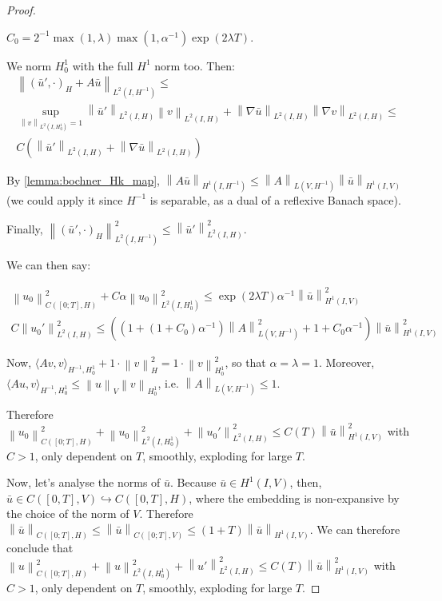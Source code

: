 \documentclass[english,a4paper,12pt,oneside]{scrbook}
\theoremstyle{break}
\newenvironment{mproof}[1][\proofname]{%
  \begin{proof}[#1]$ $\par\nobreak\ignorespaces
}{%
  \end{proof}
}
\renewcommand*{\proofname}{Proof}
\theoremstyle{remark}
\newcommand{\ds}{\displaystyle}
\newcommand{\norm}[1]{\left\lVert#1\right\rVert}
\newcommand{\HN}[1]{\norm{#1}_{H}}
\newcommand{\VN}[1]{\norm{#1}_{V}}
\newcommand{\emb}{\hookrightarrow}
\begin{document}
\begin{mproof}
$C_0 = \ds 2^{-1}\max(1,\lambda)\max(1,\alpha^{-1})\exp(2\lambda T)$.

We norm $H^1_0$ with the full $H^1$ norm too. Then:
\begin{align*}
\norm{(\bar{u}',\cdot)_H+ A \bar{u}}_{L^2(I,H^{-1})}\leq \\
\sup_{\norm{v}_{L^2(I,H^{1}_0)}=1}\norm{\bar{u}'}_{L^2(I,H)}\norm{v}_{L^2(I,H)}+\norm{\nabla \bar{u}}_{L^2(I,H)}\norm{\nabla v}_{L^2(I,H)}\leq \\C(\norm{\bar{u}'}_{L^2(I,H)}+\norm{\nabla \bar{u}}_{L^2(I,H)})
\end{align*}

By \cref{lemma:bochner_Hk_map}, $\norm{A \bar{u}}_{H^1(I, H^{-1})}\leq \norm{A}_{L(V,H^{-1})}\norm{\bar{u}}_{H^1(I,V)}$ (we could apply it since $H^{-1}$ is separable, as a dual of a reflexive Banach space).

Finally, $\norm{(\bar{u}',\cdot)_H}^2_{L^2(I,H^{-1})}\leq \norm{\bar{u}'}_{L^2(I,H)}^2$.

We can then say:

\begin{align*}
\norm{u_0}^2_{C([0;T],H)}+C\alpha\norm{u_0}_{L^2(I,H^1_0)}^2\leq \exp(2\lambda T)\alpha^{-1}\norm{\bar{u}}^2_{H^1(I,V)}\\
C\norm{u_0'}^2_{L^2(I,H)}\leq 
((1+(1+C_0)\alpha^{-1})\norm{A}_{L(V,H^{-1})}^2 +1 +C_0\alpha^{-1})\norm{\bar{u}}^2_{H^1(I,V)}
\end{align*}

Now, $\langle Av, v\rangle_{H^{-1}, H^1_0} + 1\cdot  \HN{v}^2 = 1\cdot \norm{v}_{H^1_0}^2$, so that $\alpha=\lambda=1$. Moreover, $\langle Au, v\rangle_{H^{-1}, H^1_0}\leq \VN{u}\norm{v}_{H^1_0}$, i.e. $\norm{A}_{L(V,H^{-1})}\leq 1$.

Therefore $\norm{u_0}^2_{C([0;T],H)}+\norm{u_0}_{L^2(I,H^1_0)}^2 + \norm{u_0'}^2_{L^2(I,H)}\leq C(T)\norm{\bar{u}}_{H^1(I,V)}^2$ with $C>1$, only dependent on $T$, smoothly, exploding for large $T$.

Now, let's analyse the norms of $\bar{u}$. Because $\bar{u}\in H^1(I,V)$, then, $\bar{u} \in C([0,T],V)\emb C([0,T],H)$, where the embedding is non-expansive by the choice of the norm of $V$. Therefore $\norm{\bar{u}}_{C([0;T],H)}\leq \norm{\bar{u}}_{C([0;T],V)}\leq (1+T)\norm{\bar{u}}_{H^1(I,V)}$. We can therefore conclude that $\norm{u}^2_{C([0;T],H)}+\norm{u}_{L^2(I,H^1_0)}^2 + \norm{u'}^2_{L^2(I,H)}\leq C(T)\norm{\bar{u}}_{H^1(I,V)}^2$ with $C>1$, only dependent on $T$, smoothly, exploding for large $T$.



\end{mproof}
\end{document}
